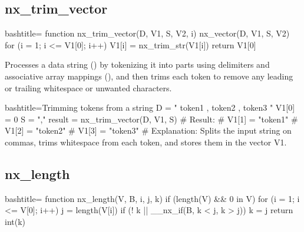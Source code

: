 \newpage
\subsection{nx_trim_vector}
\label{nx_trim_vector}
\begin{NexCodeBox}{bash}{title={}}
function nx_trim_vector(D, V1, S, V2,   i)
{
	nx_vector(D, V1, S, V2)
	for (i = 1; i <= V1[0]; i++)
		V1[i] = nx_trim_str(V1[i])
	return V1[0]
}
\end{NexCodeBox}

\begin{NexMainBox}
	\begin{NexMainBox}
		Processes a data string () by tokenizing it into parts using delimiters and associative array mappings (), and then trims each token to remove any leading or trailing whitespace or unwanted characters.
	\end{NexMainBox}
	\begin{NexMainBox}
		\begin{NexListDark}
		\end{NexListDark}
	\end{NexMainBox}
\end{NexMainBox}

\begin{NexCodeBox}{bash}{title={Trimming tokens from a string}}
	D = "  token1 ,  token2 ,  token3  "
	V1[0] = 0
	S = ","
	result = nx_trim_vector(D, V1, S)
	# Result:
	# V1[1] = "token1"
	# V1[2] = "token2"
	# V1[3] = "token3"
	# Explanation: Splits the input string on commas, trims whitespace from each token, and stores them in the vector V1.
\end{NexCodeBox}

\newpage
\subsection{nx_length}
\label{nx_length}
\begin{NexCodeBox}{bash}{title={}}
function nx_length(V, B,	i, j, k)
{
	if (length(V) && 0 in V) {
		for (i = 1; i <= V[0]; i++) {
			j = length(V[i])
			if (! k || __nx_if(B, k < j, k > j))
				k = j
		}
		return int(k)
	}
}
\end{NexCodeBox}

